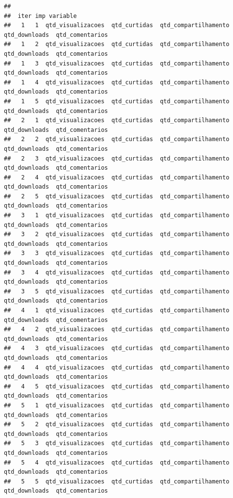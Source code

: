 \documentclass[
]{article}
\begin{document}
\begin{verbatim}
## 
##  iter imp variable
##   1   1  qtd_visualizacoes  qtd_curtidas  qtd_compartilhamento  qtd_downloads  qtd_comentarios
##   1   2  qtd_visualizacoes  qtd_curtidas  qtd_compartilhamento  qtd_downloads  qtd_comentarios
##   1   3  qtd_visualizacoes  qtd_curtidas  qtd_compartilhamento  qtd_downloads  qtd_comentarios
##   1   4  qtd_visualizacoes  qtd_curtidas  qtd_compartilhamento  qtd_downloads  qtd_comentarios
##   1   5  qtd_visualizacoes  qtd_curtidas  qtd_compartilhamento  qtd_downloads  qtd_comentarios
##   2   1  qtd_visualizacoes  qtd_curtidas  qtd_compartilhamento  qtd_downloads  qtd_comentarios
##   2   2  qtd_visualizacoes  qtd_curtidas  qtd_compartilhamento  qtd_downloads  qtd_comentarios
##   2   3  qtd_visualizacoes  qtd_curtidas  qtd_compartilhamento  qtd_downloads  qtd_comentarios
##   2   4  qtd_visualizacoes  qtd_curtidas  qtd_compartilhamento  qtd_downloads  qtd_comentarios
##   2   5  qtd_visualizacoes  qtd_curtidas  qtd_compartilhamento  qtd_downloads  qtd_comentarios
##   3   1  qtd_visualizacoes  qtd_curtidas  qtd_compartilhamento  qtd_downloads  qtd_comentarios
##   3   2  qtd_visualizacoes  qtd_curtidas  qtd_compartilhamento  qtd_downloads  qtd_comentarios
##   3   3  qtd_visualizacoes  qtd_curtidas  qtd_compartilhamento  qtd_downloads  qtd_comentarios
##   3   4  qtd_visualizacoes  qtd_curtidas  qtd_compartilhamento  qtd_downloads  qtd_comentarios
##   3   5  qtd_visualizacoes  qtd_curtidas  qtd_compartilhamento  qtd_downloads  qtd_comentarios
##   4   1  qtd_visualizacoes  qtd_curtidas  qtd_compartilhamento  qtd_downloads  qtd_comentarios
##   4   2  qtd_visualizacoes  qtd_curtidas  qtd_compartilhamento  qtd_downloads  qtd_comentarios
##   4   3  qtd_visualizacoes  qtd_curtidas  qtd_compartilhamento  qtd_downloads  qtd_comentarios
##   4   4  qtd_visualizacoes  qtd_curtidas  qtd_compartilhamento  qtd_downloads  qtd_comentarios
##   4   5  qtd_visualizacoes  qtd_curtidas  qtd_compartilhamento  qtd_downloads  qtd_comentarios
##   5   1  qtd_visualizacoes  qtd_curtidas  qtd_compartilhamento  qtd_downloads  qtd_comentarios
##   5   2  qtd_visualizacoes  qtd_curtidas  qtd_compartilhamento  qtd_downloads  qtd_comentarios
##   5   3  qtd_visualizacoes  qtd_curtidas  qtd_compartilhamento  qtd_downloads  qtd_comentarios
##   5   4  qtd_visualizacoes  qtd_curtidas  qtd_compartilhamento  qtd_downloads  qtd_comentarios
##   5   5  qtd_visualizacoes  qtd_curtidas  qtd_compartilhamento  qtd_downloads  qtd_comentarios
\end{verbatim}
\end{document}
